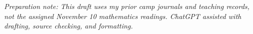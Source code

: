 \documentclass[11pt,letterpaper]{article}
\begin{document}
\bodyformat

\vspace{0.12in}
{\footnotesize\itshape Preparation note: This draft uses my prior camp journals and teaching records, not the assigned November 10 mathematics readings. ChatGPT assisted with drafting, source checking, and formatting.}
\end{document}

